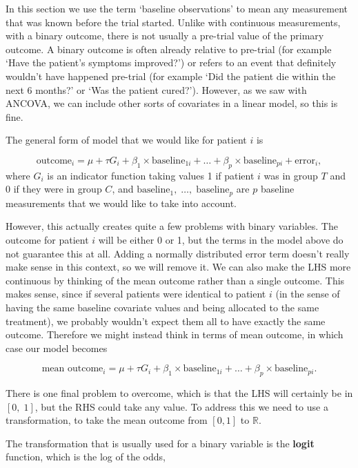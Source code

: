 \documentclass[
  openany]{book}
\theoremstyle{definition}
\theoremstyle{definition}
\theoremstyle{definition}
\theoremstyle{definition}
\theoremstyle{remark}
\begin{document}
In this section we use the term `baseline observations' to mean any measurement that was known before the trial started. Unlike with continuous measurements, with a binary outcome, there is not usually a pre-trial value of the primary outcome. A binary outcome is often already relative to pre-trial (for example `Have the patient's symptoms improved?') or refers to an event that definitely wouldn't have happened pre-trial (for example `Did the patient die within the next 6 months?' or `Was the patient cured?'). However, as we saw with ANCOVA, we can include other sorts of covariates in a linear model, so this is fine.

The general form of model that we would like for patient \(i\) is

\[\text{outcome}_i = \mu + \tau G_i + \beta_1\times{\text{baseline}_{1i}} + \ldots + \beta_p\times{\text{baseline}_{pi}} + \text{error}_i,\]
where \(G_i\) is an indicator function taking values 1 if patient \(i\) was in group \(T\) and 0 if they were in group \(C\), and \(\text{baseline}_1,\;\ldots,\;\text{baseline}_p\) are \(p\) baseline measurements that we would like to take into account.

However, this actually creates quite a few problems with binary variables. The outcome for patient \(i\) will be either 0 or 1, but the terms in the model above do not guarantee this at all. Adding a normally distributed error term doesn't really make sense in this context, so we will remove it. We can also make the LHS more continuous by thinking of the mean outcome rather than a single outcome. This makes sense, since if several patients were identical to patient \(i\) (in the sense of having the same baseline covariate values and being allocated to the same treatment), we probably wouldn't expect them all to have exactly the same outcome. Therefore we might instead think in terms of mean outcome, in which case our model becomes

\[\text{mean outcome}_i = \mu + \tau G_i + \beta_1\times{\text{baseline}_{1i}} + \ldots + \beta_p\times{\text{baseline}_{pi}}.\]

There is one final problem to overcome, which is that the LHS will certainly be in \(\left[0,\;1\right]\), but the RHS could take any value. To address this we need to use a transformation, to take the mean outcome from \(\left[0,1\right]\) to \(\mathbb{R}\).

The transformation that is usually used for a binary variable is the \textbf{logit} function, which is the log of the odds,
\end{document}

